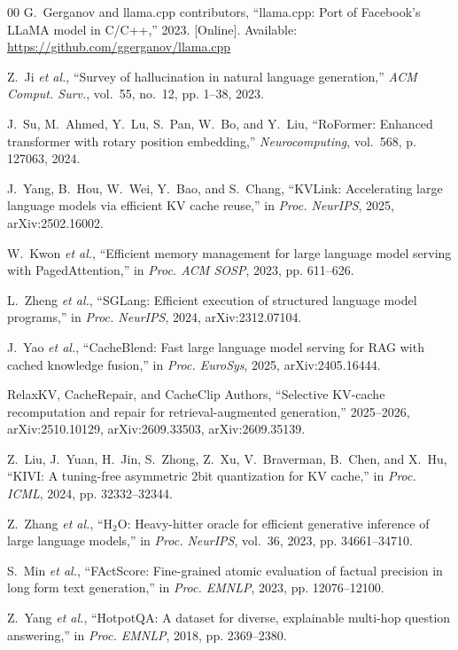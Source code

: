 \documentclass[10pt,conference]{IEEEtran}
\begin{document}
\begin{thebibliography}{00}
G.~Gerganov and {llama.cpp contributors}, ``llama.cpp: Port of Facebook's LLaMA model in C/C++,'' 2023. [Online]. Available: \url{https://github.com/ggerganov/llama.cpp}

Z.~Ji \textit{et al.}, ``Survey of hallucination in natural language generation,'' \textit{ACM Comput. Surv.}, vol.~55, no.~12, pp. 1--38, 2023.

J.~Su, M.~Ahmed, Y.~Lu, S.~Pan, W.~Bo, and Y.~Liu, ``{RoFormer}: Enhanced transformer with rotary position embedding,'' \textit{Neurocomputing}, vol.~568, p. 127063, 2024.

J.~Yang, B.~Hou, W.~Wei, Y.~Bao, and S.~Chang, ``{KVLink}: Accelerating large language models via efficient {KV} cache reuse,'' in \textit{Proc. NeurIPS}, 2025, arXiv:2502.16002.

W.~Kwon \textit{et al.}, ``Efficient memory management for large language model serving with {PagedAttention},'' in \textit{Proc. ACM SOSP}, 2023, pp. 611--626.

L.~Zheng \textit{et al.}, ``{SGLang}: Efficient execution of structured language model programs,'' in \textit{Proc. NeurIPS}, 2024, arXiv:2312.07104.

J.~Yao \textit{et al.}, ``{CacheBlend}: Fast large language model serving for {RAG} with cached knowledge fusion,'' in \textit{Proc. EuroSys}, 2025, arXiv:2405.16444.

{RelaxKV, CacheRepair, and CacheClip Authors}, ``Selective {KV}-cache recomputation and repair for retrieval-augmented generation,'' 2025--2026, arXiv:2510.10129, arXiv:2609.33503, arXiv:2609.35139.

Z.~Liu, J.~Yuan, H.~Jin, S.~Zhong, Z.~Xu, V.~Braverman, B.~Chen, and X.~Hu, ``{KIVI}: A tuning-free asymmetric 2bit quantization for {KV} cache,'' in \textit{Proc. ICML}, 2024, pp. 32332--32344.

Z.~Zhang \textit{et al.}, ``{H$_2$O}: Heavy-hitter oracle for efficient generative inference of large language models,'' in \textit{Proc. NeurIPS}, vol.~36, 2023, pp. 34661--34710.

S.~Min \textit{et al.}, ``{FActScore}: Fine-grained atomic evaluation of factual precision in long form text generation,'' in \textit{Proc. EMNLP}, 2023, pp. 12076--12100.

Z.~Yang \textit{et al.}, ``{HotpotQA}: A dataset for diverse, explainable multi-hop question answering,'' in \textit{Proc. EMNLP}, 2018, pp. 2369--2380.
\end{thebibliography}
\endgroup
\end{document}
